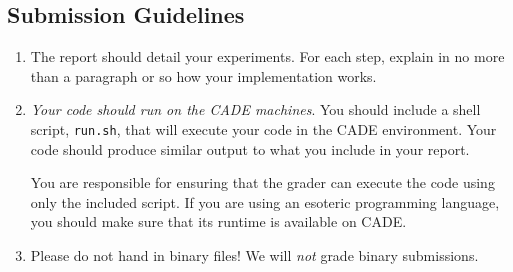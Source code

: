 \subsection*{Submission Guidelines}

\begin{enumerate}
\item The report should detail your experiments. For each step,
  explain in no more than a paragraph or so how your implementation
  works.

\item {\em Your code should run on the CADE machines}. You should
  include a shell script, {\tt run.sh}, that will execute your code
  in the CADE environment. Your code should produce similar output
  to what you include in your report.

  You are responsible for ensuring that the grader can execute the
  code using only the included script. If you are using an
  esoteric programming language, you should make sure that its
  runtime is available on CADE.


\item Please do not hand in binary files! We will {\em not} grade
  binary submissions.

\end{enumerate}

